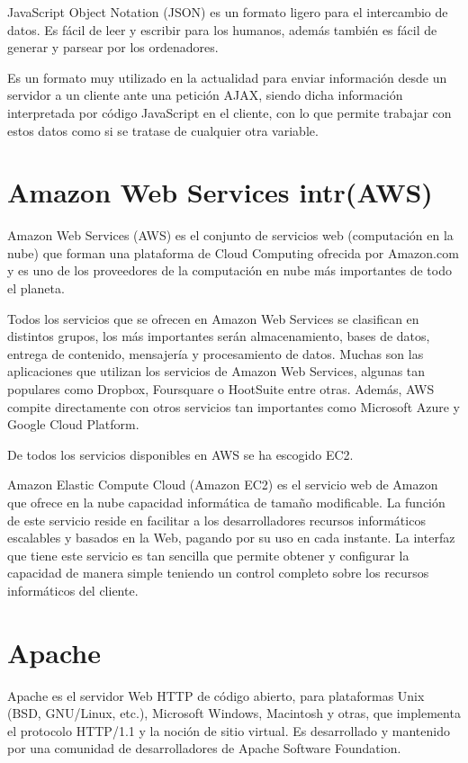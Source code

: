 JavaScript Object Notation (JSON) es un formato ligero para el intercambio de datos. Es fácil de leer y escribir para los humanos, además también es fácil de generar y parsear por los ordenadores.


Es un formato muy utilizado en la actualidad para enviar información desde un servidor a un cliente ante una petición AJAX, siendo dicha información interpretada por código JavaScript en el cliente, con lo que permite trabajar con estos datos como si se tratase de cualquier otra variable.



\section{Amazon Web Services intr(AWS)} 
\label{sec:aws}

Amazon Web Services (AWS) es el conjunto de servicios web (computación en la nube) que forman una plataforma de Cloud Computing ofrecida por Amazon.com y es uno de los proveedores de la computación en nube más importantes de todo el planeta.


Todos los servicios que se ofrecen en Amazon Web Services se clasifican en distintos grupos, los más importantes serán almacenamiento, bases de datos, entrega de contenido, mensajería y procesamiento de datos. Muchas son las aplicaciones que utilizan los servicios de Amazon Web Services, algunas tan populares como Dropbox, Foursquare o HootSuite entre otras. Además, AWS compite directamente con otros servicios tan importantes como Microsoft Azure y Google Cloud Platform.


De todos los servicios disponibles en AWS se ha escogido EC2.


Amazon Elastic Compute Cloud (Amazon EC2) es el servicio web de Amazon que ofrece en la nube capacidad informática de tamaño modificable. La función de este servicio reside en facilitar a los desarrolladores recursos informáticos escalables y basados en la Web, pagando por su uso en cada instante. La interfaz que tiene este servicio es tan sencilla que permite obtener y configurar la capacidad de manera simple teniendo un control completo sobre los recursos informáticos del cliente.



\section{Apache} 
\label{sec:apache}

Apache es el servidor Web HTTP de código abierto, para plataformas Unix (BSD, GNU/Linux, etc.), Microsoft Windows, Macintosh y otras, que implementa el protocolo HTTP/1.1 y la noción de sitio virtual.  Es desarrollado y mantenido por una comunidad de desarrolladores de Apache Software Foundation.


